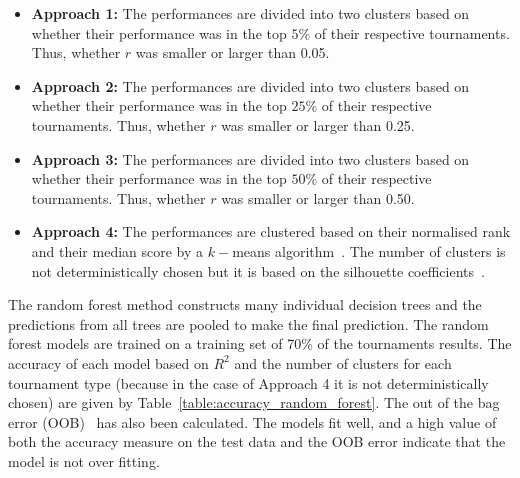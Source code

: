 \documentclass{article}
\begin{document}
\begin{itemize}
    \item \textbf{Approach 1:} The performances are divided into two clusters based
    on whether their performance was in the top \(5\%\) of their respective tournaments.
    Thus, whether \(r\) was smaller or larger than 0.05.
    \item \textbf{Approach 2:} The performances are divided into two clusters based
    on whether their performance was in the top \(25\%\) of their respective tournaments.
    Thus, whether \(r\) was smaller or larger than 0.25.
    \item \textbf{Approach 3:} The performances are divided into two clusters based
    on whether their performance was in the top \(50\%\) of their respective tournaments.
    Thus, whether \(r\) was smaller or larger than 0.50.
    \item \textbf{Approach 4:} The performances are clustered based on their normalised rank and
    their median score by a \(k-\)means algorithm~\cite{Arthur2007}. The number of
    clusters is not deterministically chosen but it is based on the silhouette
    coefficients~\cite{Rousseeuw1987}.
\end{itemize}

The random forest method constructs many individual decision trees and the
predictions from all trees are pooled to make the final prediction. The random
forest models are trained on a training set of 70\% of the tournaments results.
The accuracy of each model based on $R^2$ and the number of clusters for each
tournament type (because in the case of Approach 4 it is not
deterministically chosen) are given by Table~\ref{table:accuracy_random_forest}.
The out of the bag error (OOB)~\cite{hastie2005} has also been calculated. The
models fit well, and a high value of both the accuracy measure on the test data
and the OOB error indicate that the model is not over fitting.
\end{document}
